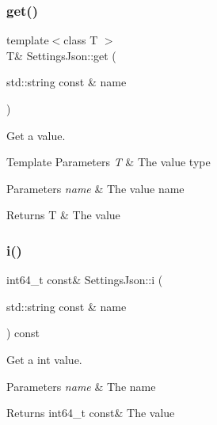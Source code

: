 \subsubsection{\texorpdfstring{get()}{get()}\hspace{0.1cm}{\footnotesize\ttfamily [2/2]}}
{\footnotesize\ttfamily template$<$class T $>$ \\
T\& Settings\+Json\+::get (\begin{DoxyParamCaption}\item[{std\+::string const \&}]{name }\end{DoxyParamCaption})\hspace{0.3cm}{\ttfamily [inline]}}



Get a value. 


\begin{DoxyTemplParams}{Template Parameters}
{\em T} & The value type \\
\hline
\end{DoxyTemplParams}

\begin{DoxyParams}{Parameters}
{\em name} & The value name \\
\hline
\end{DoxyParams}
\begin{DoxyReturn}{Returns}
T \& The value 
\end{DoxyReturn}
\mbox{\label{class_settings_json_a79e1d47938088e08a84ac721807c1551}} 
\subsubsection{\texorpdfstring{i()}{i()}\hspace{0.1cm}{\footnotesize\ttfamily [1/2]}}
{\footnotesize\ttfamily int64\+\_\+t const\& Settings\+Json\+::i (\begin{DoxyParamCaption}\item[{std\+::string const \&}]{name }\end{DoxyParamCaption}) const\hspace{0.3cm}{\ttfamily [inline]}}



Get a int value. 


\begin{DoxyParams}{Parameters}
{\em name} & The name \\
\hline
\end{DoxyParams}
\begin{DoxyReturn}{Returns}
int64\+\_\+t const\& The value 
\end{DoxyReturn}
\mbox{\label{class_settings_json_a0ccde304adda110610395b3b1f3b6fd0}} 
